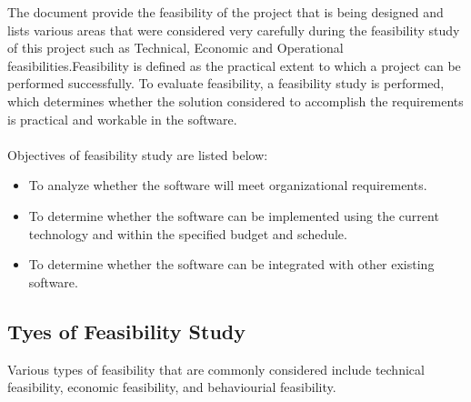 The document provide the feasibility of the project that is being designed and lists various areas that were considered very carefully during the feasibility study of this project such as Technical, Economic and Operational feasibilities.Feasibility is defined as the practical extent to which a project can be performed successfully. To evaluate feasibility, a feasibility study is performed, which determines whether the solution considered to accomplish the requirements is practical and workable in the software.\\\\ %
Objectives of feasibility study are listed below:
\begin{itemize}
	\item To analyze whether the software will meet organizational requirements.
	\item To determine whether the software can be implemented using the current technology and within the specified budget and schedule.
	\item To determine whether the software can be integrated with other existing software.
\end{itemize}

\subsection{Tyes of Feasibility Study}
Various types of feasibility that are commonly considered include technical feasibility, economic feasibility, and behaviourial feasibility.

